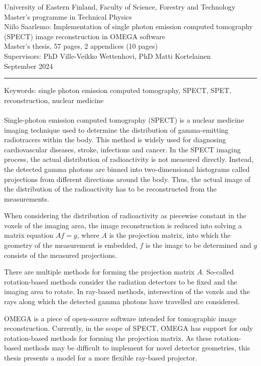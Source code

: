 \begin{titlepage}
    \noindent
    University of Eastern Finland, Faculty of Science, Forestry and Technology\\
    Master's programme in Technical Physics\\
    Niilo Saarlemo: Implementation of single photon emission computed tomography (SPECT) image reconstruction in OMEGA software\\
    Master's thesis, 57 pages, 2 appendices (10 pages)\\
    Supervisors: PhD Ville-Veikko Wettenhovi, PhD Matti Kortelainen\\
    September 2024\\

    \hrule

    \vspace{4pt}\noindent
    Keywords: single photon emission computed tomography, SPECT, SPET, reconstruction, nuclear medicine\\
    \vspace{24pt}\\
    \noindent
    Single-photon emission computed tomography (SPECT) is a nuclear medicine imaging technique used to determine the distribution of gamma-emitting radiotracers within the body. This method is widely used for diagnosing cardiovascular diseases, stroke, infections and cancer. In the SPECT imaging process, the actual distribution of radioactivity is not measured directly. Instead, the detected gamma photons are binned into two-dimensional histograms called projections from different directions around the body. Thus, the actual image of the distribution of the radioactivity has to be reconstructed from the measurements.
    
    When considering the distribution of radioactivity as piecewise constant in the voxels of the imaging area, the image reconstruction is reduced into solving a matrix equation $Af=g$, where $A$ is the projection matrix, into which the geometry of the measurement is embedded, $f$ is the image to be determined and $g$ consists of the measured projections.
    
    There are multiple methods for forming the projection matrix $A$. So-called rotation-based methods consider the radiation detectors to be fixed and the imaging area to rotate. In ray-based methods, intersection of the voxels and the rays along which the detected gamma photons have travelled are considered.
    
    OMEGA is a piece of open-source software intended for tomographic image reconstruction. Currently, in the scope of SPECT, OMEGA has support for only rotation-based methods for forming the projection matrix. As these rotation-based methods may be difficult to implement for novel detector geometries, this thesis presents a model for a more flexible ray-based projector.
    

\end{titlepage}
